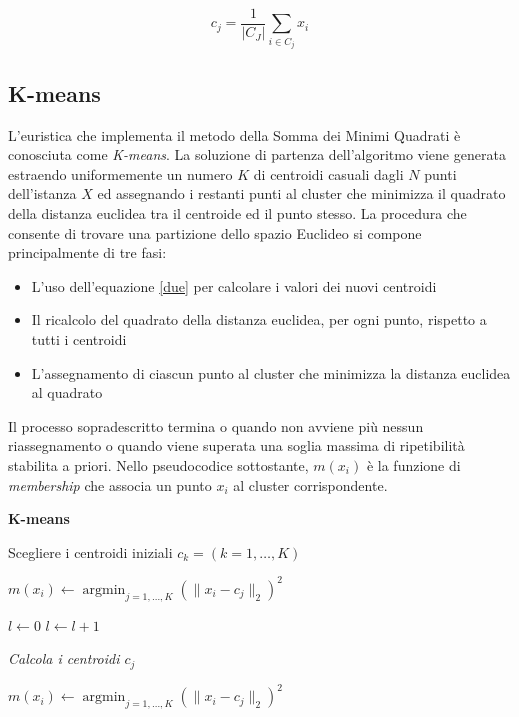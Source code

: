 \documentclass[12pt,a4paper,oneside,hidelinks]{report}
\DeclareMathOperator*{\argmin}{argmin}
\begin{document}
\begin{equation}\label{due}
	c_j = \frac{1}{| C_J |}\sum_{i \in C_j} x_i
\end{equation}

\subsection*{K-means}
L'euristica che implementa il metodo della Somma dei Minimi Quadrati è conosciuta come \textit{K-means}. La soluzione di partenza dell'algoritmo viene generata estraendo uniformemente un numero $K$ di centroidi casuali dagli $N$ punti dell'istanza $X$ ed assegnando i restanti punti al cluster che minimizza il quadrato della distanza euclidea tra il centroide ed il punto stesso. 
La procedura che consente di trovare una partizione dello spazio Euclideo si compone principalmente di tre fasi:

\begin{itemize}
\item L'uso dell'equazione \ref{due} per calcolare i valori dei nuovi centroidi 
\item Il ricalcolo del quadrato della distanza euclidea, per ogni punto, rispetto a tutti i centroidi
\item L'assegnamento di ciascun punto al cluster che minimizza la distanza euclidea al quadrato
\end{itemize}

Il processo sopradescritto termina o quando non avviene più nessun riassegnamento o quando viene superata una soglia massima di ripetibilità stabilita a priori. Nello pseudocodice sottostante, $m(x_i)$ è la funzione di \textit{membership} che associa un punto $x_i$ al cluster corrispondente.

\begin{algorithm}
\caption{\textbf{K-means}}
\begin{algorithmic}[1]
\State Scegliere i centroidi iniziali $c_k = (k = 1, \dotsc ,K)$
\item[]
	\State $m(x_i)\gets \argmin_{j =1, \dotsc ,K} (\| x_i - c_j \|_2)^2$
\EndFor
\item[]
\State $l\gets 0$
	\State $l\gets l + 1$
	\item[]
		\State \textit{Calcola i centroidi $c_j$}
	\EndFor
	\item[]
		\State $m(x_i)\gets \argmin_{j =1, \dotsc ,K} (\| x_i - c_j \|_2)^2$
	\EndFor
\EndWhile
\EndFunction
\end{algorithmic}
\end{algorithm} 
\end{document}
